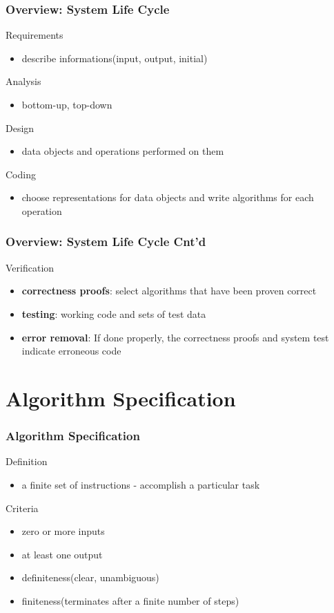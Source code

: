 \documentclass[newPxFont,sthlmFooter,nooffset]{beamer}
\begin{document}
\begin{frame}[t]
  \frametitle{Overview: System Life Cycle}
  
Requirements
\begin{itemize}
\item describe informations(input, output, initial)
\end{itemize}

Analysis
\begin{itemize}
\item bottom-up, top-down
\end{itemize}

Design
\begin{itemize}
\item data objects and operations performed on them
\end{itemize}

Coding
\begin{itemize}
\item choose representations for data objects and write algorithms for
  each operation
\end{itemize}

\end{frame}


\begin{frame}[t]
  \frametitle{Overview: System Life Cycle Cnt'd}
Verification
\begin{itemize}
\item \textbf{correctness proofs}: select algorithms that have been proven correct
\item \textbf{testing}: working code and sets of test data
\item \textbf{error removal}: If done properly, the correctness proofs
  and system test indicate erroneous code
\end{itemize}
\end{frame}


\section{Algorithm Specification}
\begin{frame}[t]
  \frametitle{Algorithm Specification}
Definition
\begin{itemize}
\item a finite set of instructions - accomplish a particular task
\end{itemize}

Criteria
\begin{itemize}
\item zero or more inputs 
\item at least one output
\item definiteness(clear, unambiguous) 
\item finiteness(terminates after a finite number of steps)
\end{itemize}

\end{frame}
\end{document}
